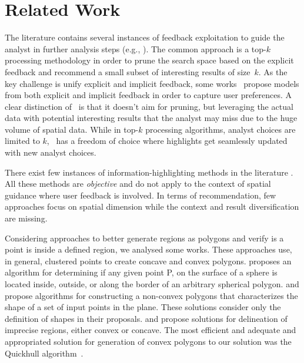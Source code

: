 \section{Related Work}
\label{sec:rel}
The literature contains several instances of feedback exploitation to guide the analyst in further analysis steps (e.g., \cite{boley2013one}). The common approach is a top-$k$ processing methodology in order to prune the search space based on the explicit feedback and recommend a small subset of interesting results of size~$k$.  As the key challenge is unify
explicit and implicit feedback, some works~\cite{AoidhBW07,Ballatore2008,Liu:2010} propose models from both explicit and implicit feedback in order to capture user preferences. A clear distinction of \sgg\ is that it doesn't aim for pruning, but leveraging the actual data with potential interesting results that the analyst may miss due to the huge volume of spatial data. While in top-$k$ processing algorithms, analyst choices are limited to $k$, \sgg\ has a freedom of choice where highlights get seamlessly updated with new analyst choices. 

\vspace{2pt}
There exist few instances of information-highlighting methods in the literature \cite{Liang2010,Robinson2011,wongsuphasawat2016voyager,willett2007scented}. All these methods are {\em objective} and do not apply to the context of spatial guidance where user feedback is involved.  In terms of recommendation, few approaches focus on spatial dimension \cite{Bao2015,Levandoski:2012} while the context and result diversification are missing.

\vspace{2pt}
Considering approaches to better generate regions as polygons and verify is a point is inside a defined region, we analysed some works. These approaches use, in general, clustered points to create concave and convex polygons. \cite{Bevis1989} proposes an algorithm for determining if any given point P, on the surface of a sphere is located inside, outside, or along the border of an arbitrary spherical polygon. \cite{DUCKHAM2008} and  \cite{FADILI2004} propose algorithms for constructing a non-convex polygons that characterizes the shape of a set of input points in the plane. These solutions consider only the definition of shapes in their proposals. \cite{ARAMPATZIS2006} and \cite{Galton2006} propose solutions for delineation of imprecise regions, either convex or concave. The most efficient and adequate and appropriated solution for generation of  convex polygons to our solution was the Quickhull  algorithm~\cite{Barber:1996}.